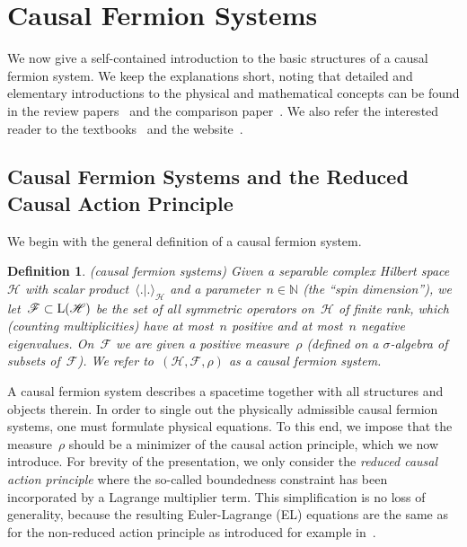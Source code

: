 \documentclass[reqno,11pt]{amsart}
\numberwithin{equation}{section}
\newtheorem{Def}{Definition}[section]
\newcommand{\la}{\langle}
\newcommand{\ra}{\rangle}
\newcommand{\1}{\mbox{\rm 1 \hspace{-1.05 em} 1}}
\newcommand{\N}{\mathbb{N}}
\renewcommand{\H}{\mathscr{H}}
\newcommand{\F}{{\mathscr{F}}}
\newcommand{\Lin}{\text{\rm{L}}}
\begin{document}
\section{Causal Fermion Systems} \label{seccfsintro}
We now give a self-contained introduction to the basic structures of a causal fermion system.
We keep the explanations short, noting that detailed and elementary introductions
to the physical and mathematical concepts can be found in the review papers~\cite{dice2014, review}
and the comparison paper~\cite[Section~2.1]{mmt-cfs}.
We also refer the interested reader to the textbooks~\cite{cfs, intro} and the website~\cite{cfsweblink}.

\subsection{Causal Fermion Systems and the Reduced Causal Action Principle}
We begin with the general definition of a causal fermion system.
\begin{Def} \label{defcfs} (causal fermion systems) {\em{ %
Given a separable complex Hilbert space~$\H$ with scalar product~$\la .|. \ra_\H$
and a parameter~$n \in \N$ (the {\em{``spin dimension''}}), we let~$\F \subset \Lin(\H)$ be the set of all
symmetric operators on~$\H$ of finite rank, which (counting multiplicities) have
at most~$n$ positive and at most~$n$ negative eigenvalues. On~$\F$ we are given
a positive measure~$\rho$ (defined on a $\sigma$-algebra of subsets of~$\F$).
We refer to~$(\H, \F, \rho)$ as a {\em{causal fermion system}}.
}}
\end{Def} \noindent

A causal fermion system describes a spacetime together
with all structures and objects therein.
In order to single out the physically admissible
causal fermion systems, one must formulate physical equations. To this end, we impose that
the measure~$\rho$ should be a minimizer of the causal action principle,
which we now introduce. For brevity of the presentation, we only consider the
{\em{reduced causal action principle}} where the so-called boundedness constraint has been
incorporated by a Lagrange multiplier term. This simplification is no loss of generality, because
the resulting Euler-Lagrange (EL) equations are the same as for the non-reduced action principle
as introduced for example in~\cite[Section~\S1.1.1]{cfs}.
\end{document}
